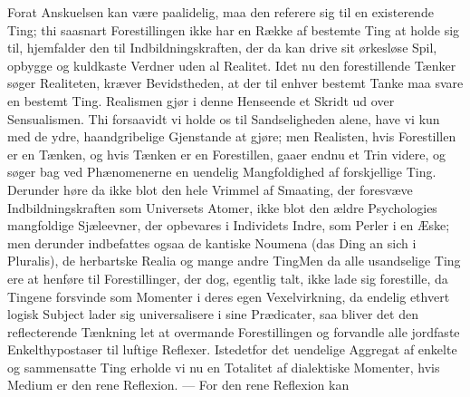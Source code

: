 \documentclass[12pt]{book}
\newcommand{\opage}[1]{\marginnote{\footnotesize\textit{[#1]}}}
\begin{document}
Forat Anskuelsen kan være paalidelig, maa den referere sig til en existerende Ting; thi
saasnart Forestillingen ikke har en Række af bestemte Ting at holde sig til, hjemfalder
den til Indbildningskraften, der da kan drive sit ørkesløse Spil, opbygge og kuldkaste
Verdner uden al Realitet. Idet nu den forestillende Tænker søger Realiteten,
\opage{183} kræver Bevidstheden, at der til enhver bestemt Tanke maa svare en bestemt Ting. Realismen
gjør i denne Henseende et Skridt ud over Sensualismen. Thi forsaavidt vi holde os til
Sandseligheden alene, have vi kun med de ydre, haandgribelige Gjenstande at gjøre; men
Realisten, hvis Forestillen er en Tænken, og hvis Tænken er en Forestillen, gaaer endnu
et Trin videre, og søger bag ved Phænomenerne en uendelig Mangfoldighed af forskjellige
Ting. Derunder høre da ikke blot den hele Vrimmel af Smaating, der foresvæve
Indbildningskraften som Universets Atomer, ikke blot den ældre Psychologies mangfoldige
%
Sjæleevner, der opbevares i Individets Indre, som Perler i en Æske; men derunder
indbefattes ogsaa de kantiske Noumena (das Ding an sich i Pluralis), de herbartske Realia
og mange andre Ting\quad Men da alle usandselige Ting ere at henføre til Forestillinger,
der dog, egentlig talt, ikke lade sig forestille, da Tingene forsvinde som Momenter i
deres egen Vexelvirkning, da endelig ethvert logisk Subject lader sig universalisere i
sine Prædicater, saa bliver det den reflecterende Tænkning let at overmande Forestillingen
og forvandle alle jordfaste Enkelthypostaser til luftige Reflexer. Istedetfor det
uendelige Aggregat af enkelte og sammensatte Ting erholde vi nu en Totalitet af
dialektiske Momenter, hvis Medium er den rene Reflexion. --- For den rene Reflexion kan
\end{document}
